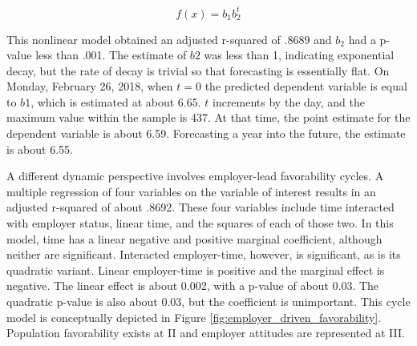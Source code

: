 \documentclass[AER]{./aea-latex-templates/AEA}
\begin{document}
        \begin{equation} f(x) = b_1b_2^t \end{equation}
        
        This nonlinear model obtained an adjusted r-squared of .8689 and $b_2$ had a p-value
        less than .001. The estimate of $b2$ was less than 1, indicating exponential
        decay, but the rate of decay is trivial so that forecasting is essentially flat.
        On Monday, February 26, 2018, when $t=0$ the predicted dependent variable is equal to $b1$, which is estimated at about 6.65.
        $t$ increments by the day, and the maximum value within the sample is 437. At that time, the point estimate
        for the dependent variable is about 6.59. Forecasting a year into the future, the estimate is about 6.55.
        
        A different dynamic perspective involves employer-lead favorability cycles.
        A multiple regression of four variables on the variable of interest results in an adjusted r-squared of about .8692.
        These four variables include time interacted with employer status, linear time, and the squares of each of those two.
        In this model, time has a linear negative and positive marginal coefficient, although neither are significant.
        Interacted employer-time, however, is significant, as is its quadratic variant. Linear employer-time is positive
        and the marginal effect is negative. The linear effect is about 0.002, with a p-value of about 0.03.
        The quadratic p-value is also about 0.03, but the coefficient is unimportant.
        This cycle model is conceptually depicted in Figure \ref{fig:employer_driven_favorability}.
        Population favorability exists at II and employer attitudes are represented at III.
        
\end{document}
